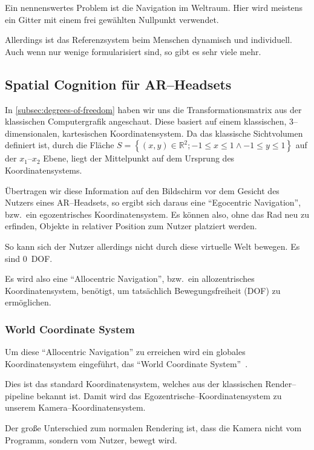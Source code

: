         Ein nennenswertes Problem ist die Navigation im Weltraum.
        Hier wird meistens ein Gitter mit einem frei gewählten Nullpunkt verwendet.

        Allerdings ist das Referenzsystem beim Menschen dynamisch und individuell.
        Auch wenn nur wenige formularisiert sind, so gibt es sehr viele mehr.

\subsection{Spatial Cognition für AR--Headsets}\label{subsec:spatial-cognition-fuer-ar-headsets}
    In \autoref{subsec:degrees-of-freedom} haben wir uns die Transformationsmatrix aus der klassischen Computergrafik angeschaut.
    Diese basiert auf einem klassischen, 3--dimensionalen, kartesischen Koordinatensystem.
    Da das klassische Sichtvolumen definiert ist, durch die Fläche $S=\left\{(x,y)\in \mathbb{R}^2;-1\leq x\leq 1\land -1\leq y\leq 1\right\}$ auf der $x_1$--$x_2$ Ebene, liegt der Mittelpunkt auf dem Ursprung des Koordinatensystems.

    Übertragen wir diese Information auf den Bildschirm vor dem Gesicht des Nutzers eines AR--Headsets, so ergibt sich daraus eine \enquote{Egocentric Navigation}, bzw.\ ein egozentrisches Koordinatensystem.
    Es können also, ohne das Rad neu zu erfinden, Objekte in relativer Position zum Nutzer platziert werden.

    So kann sich der Nutzer allerdings nicht durch diese virtuelle Welt bewegen.
    Es sind 0~DOF\@.

    Es wird also eine \enquote{Allocentric Navigation}, bzw.\ ein allozentrisches Koordinatensystem, benötigt, um tatsächlich Bewegungsfreiheit (DOF) zu ermöglichen.

    \subsubsection{World Coordinate System}\label{subsubsec:world-coordinate-system}
        Um diese \enquote{Allocentric Navigation} zu erreichen wird ein globales Koordinatensystem eingeführt, das \enquote{World Coordinate System}~\autocite{sean-kerawala-2022}.

        Dies ist das standard Koordinatensystem, welches aus der klassischen Render--pipeline bekannt ist.
        Damit wird das Egozentrische--Koordinatensystem zu unserem Kamera--Koordinatensystem.

        Der große Unterschied zum normalen Rendering ist, dass die Kamera nicht vom Programm, sondern vom Nutzer, bewegt wird.

